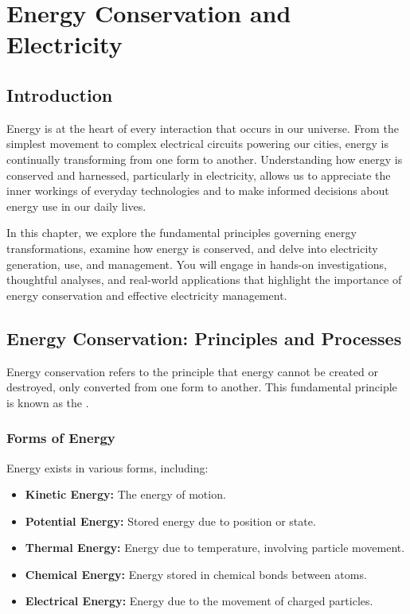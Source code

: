 \chapter{Energy Conservation and Electricity}

\section{Introduction}

Energy is at the heart of every interaction that occurs in our universe. From the simplest movement to complex electrical circuits powering our cities, energy is continually transforming from one form to another. Understanding how energy is conserved and harnessed, particularly in electricity, allows us to appreciate the inner workings of everyday technologies and to make informed decisions about energy use in our daily lives.


In this chapter, we explore the fundamental principles governing energy transformations, examine how energy is conserved, and delve into electricity generation, use, and management. You will engage in hands-on investigations, thoughtful analyses, and real-world applications that highlight the importance of energy conservation and effective electricity management.

\section{Energy Conservation: Principles and Processes}

Energy conservation refers to the principle that energy cannot be created or destroyed, only converted from one form to another. This fundamental principle is known as the .

\subsection{Forms of Energy}

Energy exists in various forms, including:

\begin{itemize}
    \item \textbf{Kinetic Energy:} The energy of motion.
    \item \textbf{Potential Energy:} Stored energy due to position or state.
    \item \textbf{Thermal Energy:} Energy due to temperature, involving particle movement.
    \item \textbf{Chemical Energy:} Energy stored in chemical bonds between atoms.
    \item \textbf{Electrical Energy:} Energy due to the movement of charged particles.
\end{itemize}

